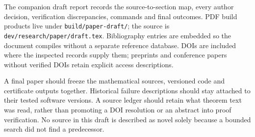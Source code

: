 \documentclass[12pt]{article}
\theoremstyle{definition}
\theoremstyle{remark}
\newcommand{\code}[1]{\nolinkurl{#1}}
\begin{document}
The companion draft report records the source-to-section map, every author
decision, verification discrepancies, commands and final outcomes. PDF
build products live under \code{build/paper-draft/}; the source is
\code{dev/research/paper/draft.tex}. Bibliography entries are embedded so
the document compiles without a separate reference database. DOIs are
included where the inspected records supply them; preprints and conference
papers without verified DOIs retain explicit access descriptions.

A final paper should freeze the mathematical sources, versioned code and
certificate outputs together. Historical failure descriptions should stay
attached to their tested software versions. A source ledger should retain
what theorem text was read, rather than promoting a DOI resolution or an
abstract into proof verification. No source in this draft is described as
novel solely because a bounded search did not find a predecessor.
\end{document}

